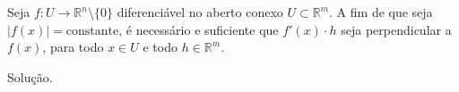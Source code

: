 \begin{homeworkProblem}
  Seja $f : U \to \mathbb{R}^n \setminus \{0\}$ diferenciável no aberto conexo $U \subset \mathbb{R}^m$. A fim de que seja $|f(x)| = \text{constante}$, é necessário e suficiente que $f'(x)\cdot h$ seja perpendicular a $f(x)$, para todo $x \in U$ e todo $h \in \mathbb{R}^m$.
  \begin{solution}
    Solução.
  \end{solution}
\end{homeworkProblem}
